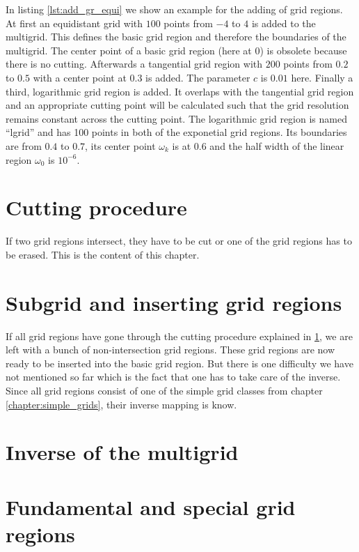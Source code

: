 In listing \ref{lst:add_gr_equi} we show an example for the adding of grid regions. At first an equidistant grid with $100$ points from $-4$ to $4$ is added to the multigrid. This defines the basic grid region and therefore the boundaries of the multigrid. The center point of a basic grid region (here at $0$) is obsolete because there is no cutting. Afterwards a tangential grid region with $200$ points from $0.2$ to $0.5$ with a center point at $0.3$ is added. The parameter $c$ is $0.01$ here. Finally a third, logarithmic grid region is added. It overlaps with the tangential grid region and an appropriate cutting point will be calculated such that the grid resolution remains constant across the cutting point. The logarithmic grid region is named   ``lgrid'' and has 100 points in both of the exponetial grid regions. Its boundaries are from $0.4$ to $0.7$, its center point $\omega_k$ is at $0.6$ and the half width of the linear region $\omega_0$ is $10^{-6}$.





\section{Cutting procedure}\label{sec:cutting_procedure}
If two grid regions intersect, they have to be cut or one of the grid regions has to be erased. This is the content of this chapter. 

\section{Subgrid and inserting grid regions}\label{sec:subgrids_and_insert}
If all grid regions have gone through the cutting procedure explained in \ref{sec:cutting_procedure}, we are left with a bunch of non-intersection grid regions. These grid regions are now ready to be inserted into the basic grid region. But there is one difficulty we have not mentioned so far which is the fact that one has to take care of the inverse. Since all grid regions consist of one of the simple grid classes from chapter \ref{chapter:simple_grids}, their inverse mapping is know.

\section{Inverse of the multigrid}\label{sec:inverse_of_the_multigrid}




\section{Fundamental and special grid regions}\label{sec:fundamental_and_special_grid_regions}
